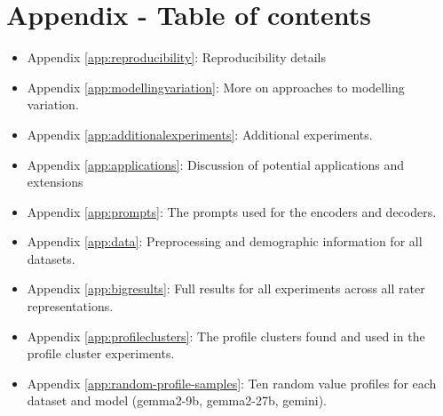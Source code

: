 \documentclass[11pt]{article}
\begin{document}
\section*{Appendix - Table of contents}
\begin{itemize}
\item Appendix \ref{app:reproducibility}: Reproducibility details
\item Appendix \ref{app:modellingvariation}: More on approaches to modelling variation.
\item Appendix \ref{app:additionalexperiments}: Additional experiments.
\item Appendix \ref{app:applications}: Discussion of potential applications and extensions
\item Appendix \ref{app:prompts}: The prompts used for the encoders and decoders.
\item Appendix \ref{app:data}: Preprocessing and demographic information for all datasets.
\item Appendix \ref{app:bigresults}: Full results for all experiments across all rater representations.
\item Appendix \ref{app:profileclusters}: The profile clusters found and used in the profile cluster experiments.
\item Appendix \ref{app:random-profile-samples}: Ten random value profiles for each dataset and model (gemma2-9b, gemma2-27b, gemini).

\end{itemize}

% 
% 
\end{document}
